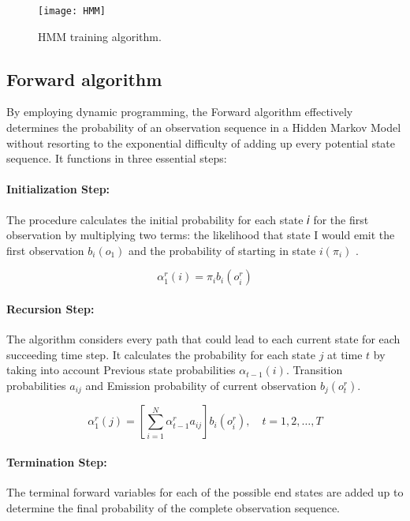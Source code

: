 \documentclass{article}
\begin{document}
\begin{figure}[!ht]
\begin{center}
\texttt{[image: HMM]}
\end{center}
\caption{\label{fig:HMM} HMM training algorithm.}
\end{figure}


\subsection{Forward algorithm}

By employing dynamic programming, the Forward algorithm effectively determines the 
probability of an observation sequence in a Hidden Markov Model without resorting to the 
exponential difficulty of adding up every potential state sequence. It functions in three 
essential steps:

\paragraph{Initialization Step:} The procedure calculates the initial probability for each state 𝑖 for the first observation by multiplying two terms: the likelihood that state I would emit the first observation $b_i(o_1)$ and the probability of starting in state $i(\pi_i)$ \citep{jm3}.

\begin{equation}
\label{equ:initial-prob}
\alpha^r_1(i) = \pi_ib_i(o^r_i)
\end{equation}

\paragraph{Recursion Step:} The algorithm considers every path that could lead to each current state for each succeeding time step. It calculates the probability for each state $j$ at time $t$ by taking into account Previous state probabilities $\alpha_{t-1}(i)$. Transition probabilities $a_{ij}$ and Emission probability of current observation $b_j(o^r_t)$.

\begin{equation}
\label{equ:initial-prob}
\alpha^r_1(j) = \left[\sum^N_{i=1}\alpha^r_{t-1}a_{ij}\right]b_i(o^r_i), \quad t = 1, 2, \ldots, T
\end{equation}

\paragraph{Termination Step:} The terminal forward variables for each of the possible end states are added up to determine the final probability of the complete observation sequence.
\end{document}
